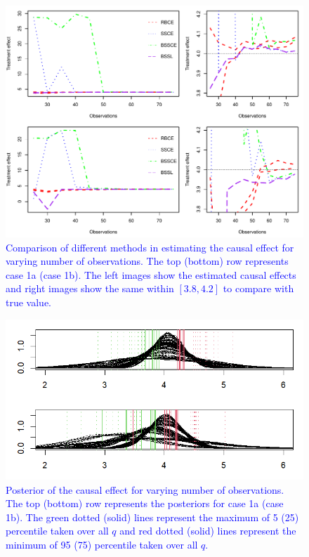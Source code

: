 \documentclass[preprint,12pt]{elsarticle}
\newcommand{\added}[1]{\textcolor{blue}{#1}}
\begin{document}
\begin{figure}
    \centering
    \includegraphics[width = 0.95\linewidth]{treat_obs_rev.pdf}
    \caption{\added{Comparison of different methods in estimating the causal effect for varying number of observations. The top (bottom) row
    represents case 1a (case 1b). The left images show the estimated causal effects and right images show the same within $[3.8,4.2]$ to compare with true value. }}
    \label{fig:comp:trt}
\end{figure}
\begin{figure}
	\centering
	\includegraphics[width = 0.95\linewidth]{treat_post_obs.png}
	\caption{\added{Posterior of the causal effect for varying number of observations. The top (bottom) row
			represents the posteriors for case 1a (case 1b). The green dotted (solid) lines represent the maximum of 5 (25) percentile taken over all $q$ and red dotted (solid) lines represent the minimum of 95 (75) percentile taken over all $q$. }}
	\label{fig:post:trt:obs}
\end{figure}
\end{document}
